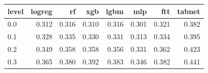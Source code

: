 \begin{tabular}{lrrrrrrr}
\toprule
level & logreg & rf & xgb & lgbm & mlp & ftt & tabnet \\
\midrule
0.0 & 0.312 & 0.316 & 0.310 & 0.316 & 0.301 & 0.321 & 0.382 \\
0.1 & 0.328 & 0.335 & 0.330 & 0.331 & 0.313 & 0.334 & 0.395 \\
0.2 & 0.349 & 0.358 & 0.358 & 0.356 & 0.331 & 0.362 & 0.423 \\
0.3 & 0.365 & 0.380 & 0.392 & 0.383 & 0.346 & 0.382 & 0.441 \\
\bottomrule
\end{tabular}
